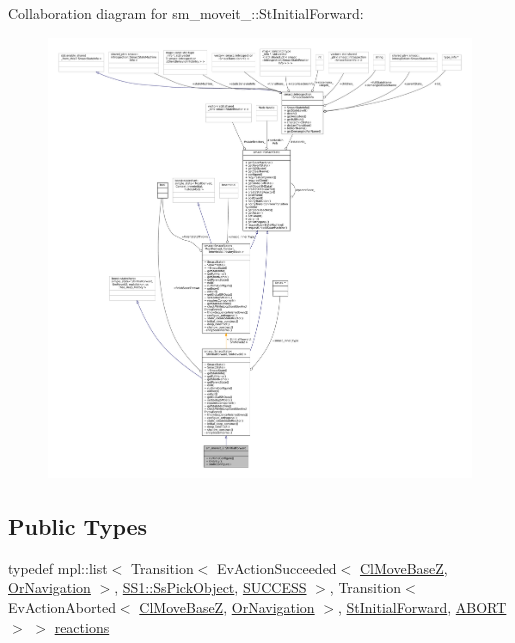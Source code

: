 Collaboration diagram for sm\+\_\+moveit\+\_\+:\+:St\+Initial\+Forward\+:
\nopagebreak
\begin{figure}[H]
\begin{center}
\leavevmode
\includegraphics[width=350pt]{structsm__moveit__2_1_1StInitialForward__coll__graph}
\end{center}
\end{figure}
\subsection*{Public Types}
\begin{DoxyCompactItemize}
\item 
typedef mpl\+::list$<$ Transition$<$ Ev\+Action\+Succeeded$<$ \hyperlink{classcl__move__base__z_1_1ClMoveBaseZ}{Cl\+Move\+BaseZ}, \hyperlink{classsm__moveit__2_1_1OrNavigation}{Or\+Navigation} $>$, \hyperlink{structsm__moveit__2_1_1SS1_1_1SsPickObject}{S\+S1\+::\+Ss\+Pick\+Object}, \hyperlink{classSUCCESS}{S\+U\+C\+C\+E\+SS} $>$, Transition$<$ Ev\+Action\+Aborted$<$ \hyperlink{classcl__move__base__z_1_1ClMoveBaseZ}{Cl\+Move\+BaseZ}, \hyperlink{classsm__moveit__2_1_1OrNavigation}{Or\+Navigation} $>$, \hyperlink{structsm__moveit__2_1_1StInitialForward}{St\+Initial\+Forward}, \hyperlink{classABORT}{A\+B\+O\+RT} $>$ $>$ \hyperlink{structsm__moveit__2_1_1StInitialForward_aa5b4642e5bbf910f5e52428b21dce093}{reactions}
\end{DoxyCompactItemize}
